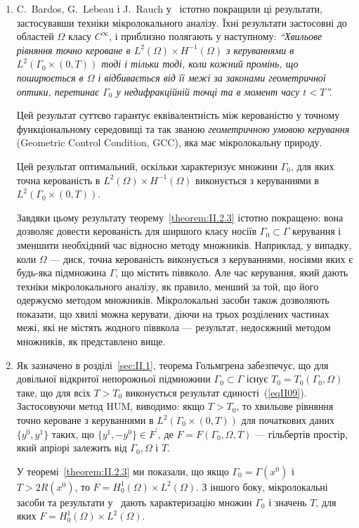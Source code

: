 \begin{enumerate}
\item C.~Bardos, G.~Lebeau і J.~Rauch у~\cite{bardos1992sharp} істотно покращили ці результати, застосувавши техніки мікролокального аналізу. Їхні результати застосовні до областей $\Omega$ класу $C^\infty$, і приблизно полягають у наступному: \emph{``Хвильове рівняння точно кероване в $L^2(\Omega) \times H^{-1}(\Omega)$ з керуваннями в $L^2(\Gamma_0 \times (0,T))$ тоді і тільки тоді, коли кожний промінь, що поширюється в $\Omega$ і відбивається від її межі за законами геометричної оптики, перетинає $\Gamma_0$ у недифракційній точці та в момент часу $t < T$''.}

Цей результат суттєво гарантує еквівалентність між керованістю у точному функціональному середовищі та так званою \emph{геометричною умовою керування} (Geometric Control Condition, GCC), яка має мікролокальну природу.

Цей результат оптимальний, оскільки характеризує множини $\Gamma_0$, для яких точна керованість в $L^2(\Omega) \times H^{-1}(\Omega)$ виконується з керуваннями в $L^2(\Gamma_0 \times (0,T))$.

Завдяки цьому результату теорему~\ref{theorem:II.2.3} істотно покращено: вона дозволяє довести керованість для ширшого класу носіїв $\Gamma_0 \subset \Gamma$ керування і зменшити необхідний час відносно методу множників. Наприклад, у випадку, коли $\Omega$ — диск, точна керованість виконується з керуваннями, носіями яких є будь-яка підмножина $\Gamma$, що містить піввколо. Але час керування, який дають техніки мікролокального аналізу, як правило, менший за той, що його одержуємо методом множників. Мікролокальні засоби також дозволяють показати, що хвилі можна керувати, діючи на трьох розділених частинах межі, які не містять жодного піввкола — результат, недосяжний методом множників, як представлено вище.

\item Як зазначено в розділі~\ref{sec:II.1}, теорема Гольмгрена забезпечує, що для довільної відкритої непорожньої підмножини $\Gamma_0 \subset \Gamma$ існує $T_0 = T_0(\Gamma_0, \Omega)$ таке, що для всіх $T>T_0$ виконується результат єдиності~(\ref{eqII09}). Застосовуючи метод HUM, виводимо: якщо $T>T_0$, то хвильове рівняння точно кероване з керуваннями в $L^2(\Gamma_0 \times (0,T))$ для початкових даних $\{y^0, y^1\}$ таких, що $\{y^1, -y^0\} \in F^\prime$, де $F = F(\Gamma_0, \Omega, T)$ — гільбертів простір, який апріорі залежить від $\Gamma_0, \Omega$ і $T$.

У теоремі~\ref{theorem:II.2.3} ми показали, що якщо $\Gamma_0 = \Gamma(x^0)$ і $T>2R(x^0)$, то $F = H_{0}^1(\Omega) \times L^2(\Omega)$.
З іншого боку, мікролокальні засоби та результати у~\cite{bardos1992sharp} дають характеризацію множин $\Gamma_0$ і значень $T$, для яких $F = H_{0}^1(\Omega) \times L^2(\Omega)$.


\end{enumerate}
